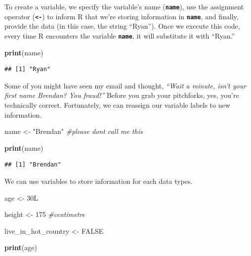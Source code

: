 \documentclass[
]{book}
\newenvironment{Shaded}{\begin{snugshade}}{\end{snugshade}}
\newcommand{\CommentTok}[1]{\textcolor[rgb]{0.56,0.35,0.01}{\textit{#1}}}
\newcommand{\ConstantTok}[1]{\textcolor[rgb]{0.56,0.35,0.01}{#1}}
\newcommand{\DecValTok}[1]{\textcolor[rgb]{0.00,0.00,0.81}{#1}}
\newcommand{\FunctionTok}[1]{\textcolor[rgb]{0.13,0.29,0.53}{\textbf{#1}}}
\newcommand{\NormalTok}[1]{#1}
\newcommand{\OtherTok}[1]{\textcolor[rgb]{0.56,0.35,0.01}{#1}}
\newcommand{\StringTok}[1]{\textcolor[rgb]{0.31,0.60,0.02}{#1}}
\begin{document}
To create a variable, we specify the variable's name (\textbf{\texttt{name}}), use the assignment operator (\textbf{\texttt{\textless{}-}}) to inform R that we're storing information in \textbf{\texttt{name}}, and finally, provide the data (in this case, the string ``Ryan''). Once we execute this code, every time R encounters the variable \textbf{\texttt{name}}, it will substitute it with ``Ryan.''

\begin{Shaded}
\begin{Highlighting}[]
\FunctionTok{print}\NormalTok{(name)}
\end{Highlighting}
\end{Shaded}

\begin{verbatim}
## [1] "Ryan"
\end{verbatim}

Some of you might have seen my email and thought, \emph{``Wait a minute, isn't your first name Brendan? You fraud!''} Before you grab your pitchforks, yes, you're technically correct. Fortunately, we can reassign our variable labels to new information.

\begin{Shaded}
\begin{Highlighting}[]
\NormalTok{name }\OtherTok{\textless{}{-}} \StringTok{"Brendan"} \CommentTok{\#please don\textquotesingle{}t call me this}

\FunctionTok{print}\NormalTok{(name)}
\end{Highlighting}
\end{Shaded}

\begin{verbatim}
## [1] "Brendan"
\end{verbatim}

We can use variables to store information for each data types.

\begin{Shaded}
\begin{Highlighting}[]
\NormalTok{age }\OtherTok{\textless{}{-}}\NormalTok{ 30L}

\NormalTok{height }\OtherTok{\textless{}{-}} \DecValTok{175} \CommentTok{\#centimetre }

\NormalTok{live\_in\_hot\_country }\OtherTok{\textless{}{-}} \ConstantTok{FALSE}

\FunctionTok{print}\NormalTok{(age)}
\end{Highlighting}
\end{Shaded}
\end{document}
